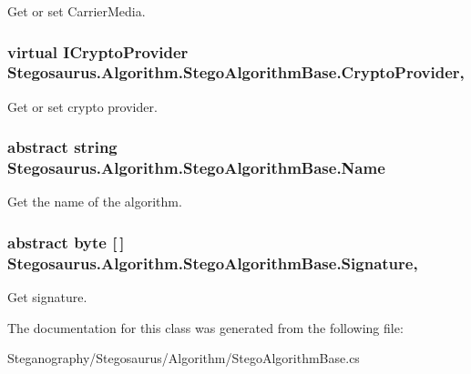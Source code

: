 Get or set Carrier\+Media. 

\subsubsection[{\texorpdfstring{Crypto\+Provider}{CryptoProvider}}]{\setlength{\rightskip}{0pt plus 5cm}virtual {\bf I\+Crypto\+Provider} Stegosaurus.\+Algorithm.\+Stego\+Algorithm\+Base.\+Crypto\+Provider\hspace{0.3cm}{\ttfamily [get]}, {\ttfamily [set]}}\hypertarget{class_stegosaurus_1_1_algorithm_1_1_stego_algorithm_base_a58a15b795b59a77a818c12dd41b13841}{}\label{class_stegosaurus_1_1_algorithm_1_1_stego_algorithm_base_a58a15b795b59a77a818c12dd41b13841}


Get or set crypto provider. 

\subsubsection[{\texorpdfstring{Name}{Name}}]{\setlength{\rightskip}{0pt plus 5cm}abstract string Stegosaurus.\+Algorithm.\+Stego\+Algorithm\+Base.\+Name\hspace{0.3cm}{\ttfamily [get]}}\hypertarget{class_stegosaurus_1_1_algorithm_1_1_stego_algorithm_base_a348f32065aef0fec157f90d252edd71c}{}\label{class_stegosaurus_1_1_algorithm_1_1_stego_algorithm_base_a348f32065aef0fec157f90d252edd71c}


Get the name of the algorithm. 

\subsubsection[{\texorpdfstring{Signature}{Signature}}]{\setlength{\rightskip}{0pt plus 5cm}abstract byte \mbox{[}$\,$\mbox{]} Stegosaurus.\+Algorithm.\+Stego\+Algorithm\+Base.\+Signature\hspace{0.3cm}{\ttfamily [get]}, {\ttfamily [protected]}}\hypertarget{class_stegosaurus_1_1_algorithm_1_1_stego_algorithm_base_ace06936bcfcd9e9d9bb08ff97b1144f0}{}\label{class_stegosaurus_1_1_algorithm_1_1_stego_algorithm_base_ace06936bcfcd9e9d9bb08ff97b1144f0}


Get signature. 



The documentation for this class was generated from the following file\+:\begin{DoxyCompactItemize}
\item 
Steganography/\+Stegosaurus/\+Algorithm/Stego\+Algorithm\+Base.\+cs\end{DoxyCompactItemize}
